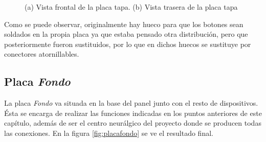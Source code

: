 \begin{figure}[htpb]%
    \centering 
    \hspace{10pt}%
    \caption{(a) Vista frontal de la placa tapa. (b) Vista trasera de la placa tapa}
    \label{fig:placatapa} 
    \end{figure} 

Como se puede observar, originalmente hay hueco para que los botones sean soldados en la propia placa ya 
que estaba pensado otra distribución, pero que posteriormente fueron sustituidos, por lo que en dichos 
huecos se sustituye por conectores atornillables.
    
\subsection{Placa \textit{Fondo}}

La placa \textit{Fondo} va situada en la base del panel junto con el resto de dispositivos. Ésta se encarga
de realizar las funciones indicadas en los puntos anteriores de este capítulo, además de ser el centro neurálgico
del proyecto donde se producen todas las conexiones. En la figura \ref{fig:placafondo} se ve el resultado final.

